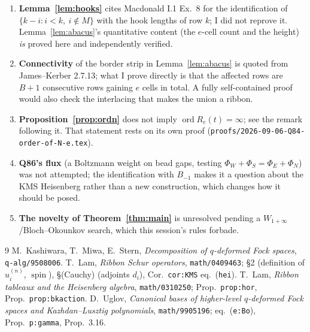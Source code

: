 \documentclass[11pt]{article}
\theoremstyle{definition}
\DeclareMathOperator{\spin}{spin}
\DeclareMathOperator{\ord}{ord}
\begin{document}
\begin{enumerate}
\item \textbf{Lemma~\ref{lem:hooks}} cites Macdonald I.1 Ex.~8 for the
identification of $\{k-i : i<k,\ i\notin M\}$ with the hook lengths of row $k$; I
did not reprove it.  Lemma~\ref{lem:abacus}'s quantitative content (the $e$-cell
count and the height) \emph{is} proved here and independently verified.
\item \textbf{Connectivity} of the border strip in Lemma~\ref{lem:abacus} is quoted
from James--Kerber 2.7.13; what I prove directly is that the affected rows are
$B+1$ consecutive rows gaining $e$ cells in total.  A fully self-contained proof
would also check the interlacing that makes the union a ribbon.
\item \textbf{Proposition~\ref{prop:ordn}} does not imply $\ord R_e(t)=\infty$; see
the remark following it.  That statement rests on its own proof
(\texttt{proofs/2026-09-06-Q84-order-of-N-e.tex}).
\item \textbf{Q86's flux} (a Boltzmann weight on bead gaps, testing
$\Phi_W+\Phi_S=\Phi_E+\Phi_N$) was not attempted; the identification with $B_{-1}$
makes it a question about the KMS Heisenberg rather than a new construction, which
changes how it should be posed.
\item \textbf{The novelty of Theorem~\ref{thm:main}} is unresolved pending a
$W_{1+\infty}$/Bloch--Okounkov search, which this session's rules forbade.
\end{enumerate}

\begin{thebibliography}{9}
 M.~Kashiwara, T.~Miwa, E.~Stern, \emph{Decomposition of
$q$-deformed Fock spaces}, \texttt{q-alg/9508006}.
 T.~Lam, \emph{Ribbon Schur operators},
\texttt{math/0409463}; \S2 (definition of $u_i^{(n)}$, $\spin$), \S(Cauchy)
(adjoints $d_i$), Cor.~\texttt{cor:KMS} eq.~(\texttt{hei}).
 T.~Lam, \emph{Ribbon tableaux and the Heisenberg
algebra}, \texttt{math/0310250}; Prop.~\texttt{prop:hor}, Prop.~\texttt{prop:bkaction}.
 D.~Uglov, \emph{Canonical bases of higher-level $q$-deformed
Fock spaces and Kazhdan--Lusztig polynomials}, \texttt{math/9905196};
eq.~(\texttt{e:Bo}), Prop.~\texttt{p:gamma}, Prop.~3.16.
\end{thebibliography}
\end{document}
